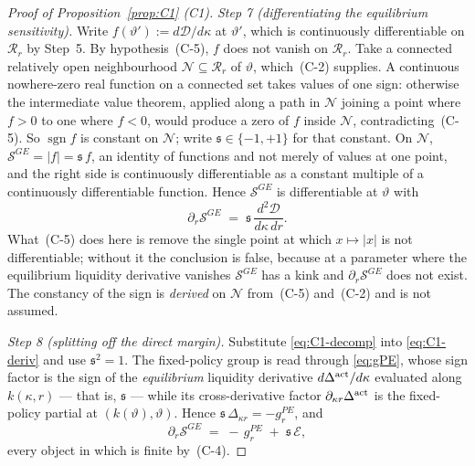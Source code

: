 \begin{proof}[Proof of Proposition~\ref{prop:C1} (C1)]
\emph{Step 7 (differentiating the equilibrium sensitivity).} Write $f(\vartheta') :=
d\mathcal D/d\kappa$ at $\vartheta'$, which is continuously differentiable on $\mathcal R_r$ by
Step~5. By hypothesis~(C-5), $f$ does not vanish on $\mathcal R_r$. Take a connected relatively open
neighbourhood $\mathcal N\subseteq\mathcal R_r$ of $\vartheta$, which~(C-2) supplies. A continuous
nowhere-zero real function on a connected set takes values of one sign: otherwise the intermediate
value theorem, applied along a path in $\mathcal N$ joining a point where $f>0$ to one where $f<0$,
would produce a zero of $f$ inside $\mathcal N$, contradicting~(C-5). So
$\operatorname{sgn} f$ is constant on $\mathcal N$; write $\mathfrak s\in\{-1,+1\}$ for that
constant. On $\mathcal N$,
$\mathcal S^{GE} = \lvert f\rvert = \mathfrak s\,f$, an identity of functions and not merely of
values at one point, and the right side is continuously differentiable as a constant multiple of a
continuously differentiable function. Hence $\mathcal S^{GE}$ is differentiable at $\vartheta$ with
\begin{equation}
\label{eq:C1-deriv}
\partial_r\mathcal S^{GE} \;=\; \mathfrak s\,\frac{d^2\mathcal D}{d\kappa\,dr} .
\end{equation}
What~(C-5) does here is remove the single point at which $x\mapsto|x|$ is not differentiable;
without it the conclusion is false, because at a parameter where the equilibrium liquidity
derivative vanishes $\mathcal S^{GE}$ has a kink and $\partial_r\mathcal S^{GE}$ does not exist. The
constancy of the sign is \emph{derived} on $\mathcal N$ from~(C-5) and~(C-2) and is not assumed.

\emph{Step 8 (splitting off the direct margin).} Substitute \eqref{eq:C1-decomp} into
\eqref{eq:C1-deriv} and use $\mathfrak s^2 = 1$. The fixed-policy group is read through
\eqref{eq:gPE}, whose sign factor is the sign of the \emph{equilibrium} liquidity derivative
$d\Delta^{\mathrm{act}}/d\kappa$ evaluated along $k(\kappa,r)$ --- that is, $\mathfrak s$ --- while its
cross-derivative factor $\partial_{\kappa r}\Delta^{\mathrm{act}}$ is the fixed-policy partial at
$(k(\vartheta),\vartheta)$. Hence $\mathfrak s\,\Delta_{\kappa r} = -g_r^{PE}$, and
\begin{equation}
\label{eq:C1-split}
\partial_r\mathcal S^{GE} \;=\; -\,g_r^{PE} \;+\; \mathfrak s\,\mathcal E ,
\end{equation}
every object in which is finite by~(C-4).


\end{proof}
